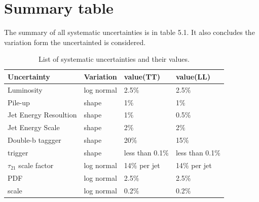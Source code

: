 \clearpage
\section{Summary table}
The summary of all systematic uncertainties is in table 5.1. It also concludes the variation form the uncertainted is considered.
\begin{table}[h!]
  \begin{center}
    \begin{tabular}{l|l|l|l}
    Uncertainty & Variation & value(TT) & value(LL) \\
    \hline
    Luminosity & log normal & 2.5$\% $ & 2.5$\% $\\
    Pile-up & shape & 1$\% $ & 1$\% $\\
    Jet Energy Resoultion & shape & 1$\% $ & 0.5$\% $\\
    Jet Energy Scale & shape & 2$\% $ & 2$\% $\\
    Double-b taggger & shape & 20$\% $ & 15$\% $ \\
    trigger & shape & less than 0.1$\% $ & less than 0.1$\% $\\
    $\tau _{21}$ scale factor & log normal & 14$\% $ per jet & 14$\% $ per jet\\
    PDF & log normal & 2.5$\% $ & 2.5$\% $\\
    scale & log normal & 0.2$\% $ & 0.2$\% $\\
    \hline
    \end{tabular}
  \end{center}

  \caption{List of systematic uncertainties and their values.}
\end{table} 